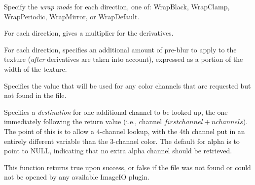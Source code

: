 \vspace{-24pt}
\vspace{10pt}
Specify the \emph{wrap mode} for each direction, one of: 
{\cf WrapBlack}, {\cf WrapClamp}, {\cf WrapPeriodic}, {\cf WrapMirror},
or {\cf WrapDefault}.
\apiend

\vspace{-24pt}
\vspace{10pt}
For each direction, gives a multiplier for the derivatives.
\apiend

\vspace{-24pt}
\vspace{10pt}
For each direction, specifies an additional amount of pre-blur to apply
to the texture (\emph{after} derivatives are taken into account),
expressed as a portion of the width of the texture.
\apiend

\vspace{-24pt}
\vspace{10pt}
Specifies the value that will be used for any color channels that are
requested but not found in the file.
\apiend

\vspace{-24pt}
\vspace{10pt}
Specifies a \emph{destination} for one additional channel to be looked
up, the one immediately following the return value (i.e., channel
$\mathit{firstchannel}+\mathit{nchannels}$).  The point of this is to
allow a 4-channel lookup, with the 4th channel put in an entirely
different variable than the 3-channel color.  The default for {\cf
  alpha} is to point to NULL, indicating that no extra alpha channel
should be retrieved.
\apiend

This function returns {\cf true} upon success, or {\cf false} if the
file was not found or could not be opened by any available ImageIO
plugin.
\apiend



